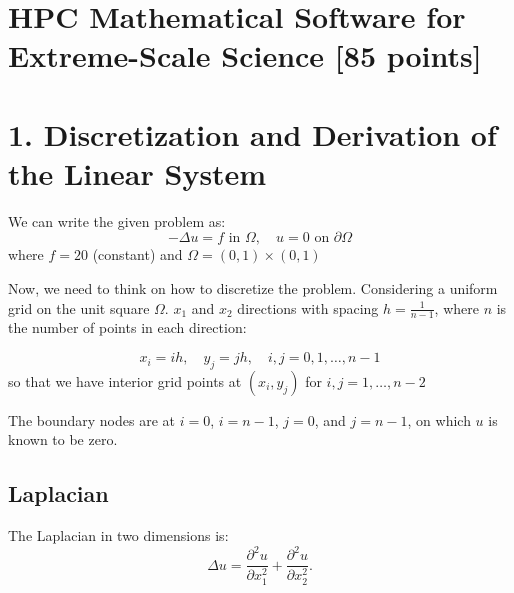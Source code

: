 \documentclass[unicode,11pt,a4paper,oneside,numbers=endperiod,openany]{scrartcl}
\begin{document}
\setassignment

\newline

\assignmentpolicy


\section{HPC Mathematical Software for Extreme-Scale Science  [85 points]}
\section*{1. Discretization and Derivation of the Linear System}
We can write the given problem as:
\begin{equation}
    -\Delta u = f \text{ in } \Omega, \quad u = 0 \text{ on } \partial\Omega
\end{equation}
where $f = 20$ (constant) and $\Omega = (0,1) \times (0,1)$

Now, we need to think on how to discretize the problem. Considering a uniform grid on the unit square $\Omega$. 
$x_1$ and $x_2$ directions with spacing $h = \frac{1}{n-1}$, where $n$ is the number of points in each direction: 

\begin{equation}
    x_i = ih, \quad y_j = jh, \quad i,j = 0,1,\ldots,n-1
\end{equation}
so that we have interior grid points at $(x_i, y_j)$ for $i,j = 1,\ldots,n-2$

The boundary nodes are at $i=0$, $i=n-1$, $j=0$, and $j=n-1$, on which $u$ is known to be zero.

\subsection*{Laplacian}
The Laplacian in two dimensions is:
\begin{equation}
    \Delta u = \frac{\partial^2 u}{\partial x_1^2} + \frac{\partial^2 u}{\partial x_2^2}.
\end{equation}
\end{document}
